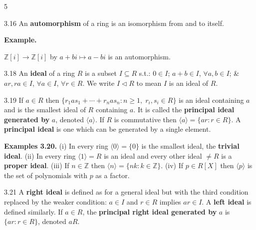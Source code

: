 \documentclass[8pt]{extarticle}
\newenvironment{example}{%
  \par\noindent
  \textbf{Example.}\ \normalfont
  \ignorespaces
}{%
  \par
}
\begin{document}
\begin{multicols*}{5}
        \begin{definition}{3.16}
            An \textbf{automorphism} of a ring is an isomorphism from and to itself.
        \end{definition}

        \begin{example}
            \(\mathbb{Z}[i]\to\mathbb{Z}[i]\) by \(a+bi\mapsto a-bi\) is an automorphism.
        \end{example}

        \begin{definition}{3.18}
            An \textbf{ideal} of a ring \(R\) is a subset \(I\subseteq R\) s.t.: \(0\in I\); \(a+b\in I\), \(\forall a,b\in I\); \& \(ar,ra\in I\), \(\forall a\in I\), \(\forall r\in R\). We write \(I\lhd R\) to mean \(I\) is an ideal of \(R\).
        \end{definition}

        \begin{definition}{3.19}
            If \(a\in R\) then \(\{r_1as_1+\cdots+r_nas_n:n\ge1,\;r_i,s_i\in R\}\) is an ideal containing \(a\) and is the smallest ideal of \(R\) containing \(a\). It is called the \textbf{principal ideal generated by} \(a\), denoted \(\langle a\rangle\). If \(R\) is commutative then \(\langle a\rangle=\{ar:r\in R\}\). A \textbf{principal ideal} is one which can be generated by a single element.
        \end{definition}

        \textbf{Examples 3.20.}
        (i) In every ring \(\langle0\rangle=\{0\}\) is the smallest ideal, the \textbf{trivial ideal}.
        (ii) In every ring \(\langle1\rangle=R\) is an ideal and every other ideal \(\ne R\) is a \textbf{proper ideal}.
        (iii) If \(n\in\mathbb{Z}\) then \(\langle n\rangle=\{nk:k\in\mathbb{Z}\}\).
        (iv) If \(p\in R[X]\) then \(\langle p\rangle\) is the set of polynomials with \(p\) as a factor.

        \begin{definition}{3.21}
            A \textbf{right ideal} is defined as for a general ideal but with the third condition replaced by the weaker condition: \(a\in I\) and \(r\in R\) implies \(ar\in I\). A \textbf{left ideal} is defined similarly. If \(a\in R\), the \textbf{principal right ideal generated by} \(a\) is \(\{ar:r\in R\}\), denoted \(aR\).
        \end{definition}


\end{multicols*}
\end{document}
